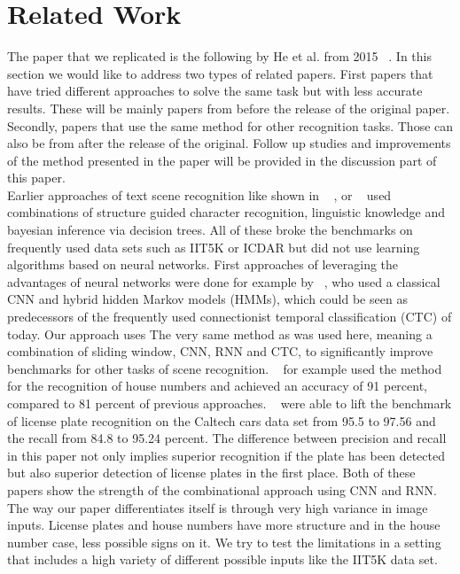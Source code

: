 \documentclass{utue} %
\begin{document}
\section{Related Work}
The paper that we replicated is the following by He et al. from 2015 ~\cite{2015arXiv150604395H}. In this section we would like to address two types of related papers. First papers that have tried different approaches to solve the same task but with less accurate results. These will be mainly papers from before the release of the original paper. Secondly, papers that use the same method for other recognition tasks. Those can also be from after the release of the original. Follow up studies and improvements of the method presented in the paper will be provided in the discussion part of this paper. \\
Earlier approaches of text scene recognition like shown in ~\cite{Mishra2012a} , or ~\cite{6727574} used combinations of structure guided character recognition, linguistic knowledge and bayesian inference via decision trees. All of these broke the benchmarks on frequently used data sets such as IIT5K or ICDAR but did not use learning algorithms based on neural networks. First approaches of leveraging the advantages of neural networks were done for example by ~\cite{DBLP:journals/corr/AlsharifP13}, who used a classical CNN and hybrid hidden Markov models (HMMs), which could be seen as predecessors of the frequently used connectionist temporal classification (CTC) of today. Our approach uses 
The very same method as was used here, meaning a combination of sliding window, CNN, RNN and CTC, to significantly improve benchmarks for other tasks of scene recognition. ~\cite{DBLP:journals/corr/GuoTLL16} for example used the method for the recognition of house numbers and achieved an accuracy of 91 percent, compared to 81 percent of previous approaches. ~\cite{DBLP:journals/corr/LiS16} were able to lift the benchmark of license plate recognition on the Caltech cars data set from 95.5 to 97.56 and the recall from 84.8 to 95.24 percent. The difference between precision and recall in this paper not only implies superior recognition if the plate has been detected but also superior detection of license plates in the first place. Both of these papers show the strength of the combinational approach using CNN and RNN. The way our paper differentiates itself is through very high variance in image inputs. License plates and house numbers have more structure and in the house number case, less possible signs on it. We try to test the limitations in a setting that includes a high variety of different possible inputs like the IIT5K data set. 
\end{document}
